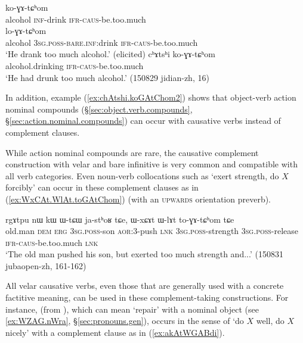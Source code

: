 \begin{exe}
\ex \label{ex:GAtChom}
\begin{xlist}
\ex \label{ex:kAtshi.koGAtChom}
 ko-ɣɤ-tɕʰom \\
alcohol \textsc{inf}-drink \textsc{ifr}-\textsc{caus}-be.too.much \\
\ex \label{ex:Wtshi.loGAtChom}
 lo-ɣɤ-tɕʰom \\
alcohol \textsc{3sg}.\textsc{poss}-\textsc{bare}.\textsc{inf}:drink \textsc{ifr}-\textsc{caus}-be.too.much \\
\glt `He drank too much alcohol.' (elicited)
\ex \label{ex:chAtshi.koGAtChom2}
\gll cʰɤtsʰi ko-ɣɤ-tɕʰom \\
alcohol.drinking \textsc{ifr}-\textsc{caus}-be.too.much \\
\glt `He had drunk too much alcohol.' (150829 jidian-zh, 16)
\end{xlist}
\end{exe}

In addition, example (\ref{ex:chAtshi.koGAtChom2}) shows that object-verb action nominal compounds (§\ref{sec:object.verb.compounds}, §\ref{sec:action.nominal.compounds}) can occur with causative verbs instead of complement clauses.

While action nominal compounds are rare, the causative complement construction with velar and bare infinitive is very common and compatible with all verb categories. Even noun-verb collocations such as  `exert strength, do $X$ forcibly' can occur in these complement clauses as in (\ref{ex:WxCAt.WlAt.toGAtChom}) (with an  \textsc{upwards} orientation preverb).

\begin{exe}
\ex \label{ex:WxCAt.WlAt.toGAtChom}
\gll  rgɤtpu nɯ kɯ ɯ-tɕɯ ja-stʰoʁ tɕe, ɯ-xɕɤt ɯ-lɤt to-ɣɤ-tɕʰom tɕe \\
old.man \textsc{dem} \textsc{erg} \textsc{3sg}.\textsc{poss}-son \textsc{aor}:3\flobv{}-push \textsc{lnk} \textsc{3sg}.\textsc{poss}-strength \textsc{3sg}.\textsc{poss}-release \textsc{ifr}-\textsc{caus}-be.too.much \textsc{lnk} \\
\glt `The old man pushed his son, but exerted too much strength and...'   (150831 jubaopen-zh, 161-162)
\end{exe}

All velar causative verbs, even those that are generally used with a concrete factitive meaning, can be used in these complement-taking constructions. For instance,  (from ), which can mean `repair' with a nominal object (see \ref{ex:WZAG.nWra}, §\ref{sec:pronouns.gen}), occurs in the sense of `do $X$ well, do $X$ nicely' with a complement clause as in (\ref{ex:akAtWGABdi}).

